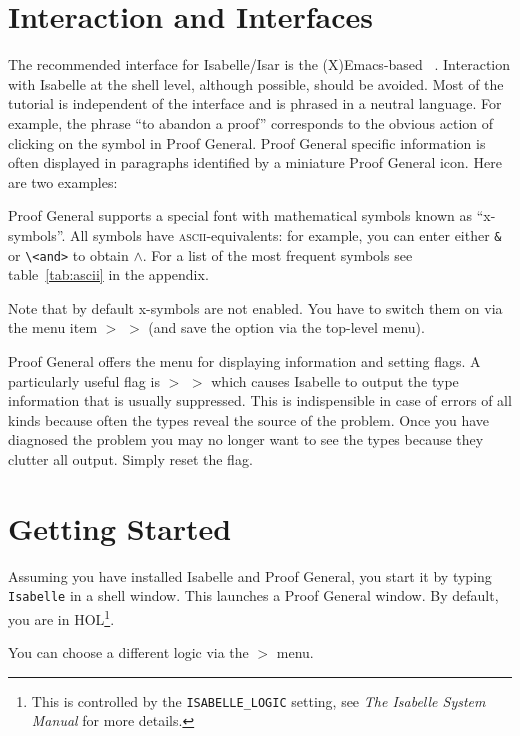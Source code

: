 \section{Interaction and Interfaces}
\label{sec:interface}

The recommended interface for Isabelle/Isar is the (X)Emacs-based
~\cite{proofgeneral,Aspinall:TACAS:2000}.
Interaction with Isabelle at the shell level, although possible,
should be avoided. Most of the tutorial is independent of the
interface and is phrased in a neutral language. For example, the
phrase ``to abandon a proof'' corresponds to the obvious
action of clicking on the  symbol in Proof General.
Proof General specific information is often displayed in paragraphs
identified by a miniature Proof General icon. Here are two examples:
\begin{pgnote}
Proof General supports a special font with mathematical symbols known
as ``x-symbols''. All symbols have \textsc{ascii}-equivalents: for
example, you can enter either \verb!&!  or \verb!\<and>! to obtain
$\land$. For a list of the most frequent symbols see table~\ref{tab:ascii}
in the appendix.

Note that by default x-symbols are not enabled. You have to switch
them on via the menu item  $>$  $>$
 (and save the option via the top-level
 menu).
\end{pgnote}

\begin{pgnote}
Proof General offers the  menu for displaying
information and setting flags. A particularly useful flag is
 $>$  $>$  which
causes Isabelle to output the type information that is usually
suppressed. This is indispensible in case of errors of all kinds
because often the types reveal the source of the problem. Once you
have diagnosed the problem you may no longer want to see the types
because they clutter all output. Simply reset the flag.
\end{pgnote}

\section{Getting Started}

Assuming you have installed Isabelle and Proof General, you start it by typing
\texttt{Isabelle} in a shell window. This launches a Proof General window.
By default, you are in HOL\footnote{This is controlled by the
\texttt{ISABELLE_LOGIC} setting, see \emph{The Isabelle System Manual}
for more details.}.

\begin{pgnote}
You can choose a different logic via the  $>$
 menu.
\end{pgnote}
